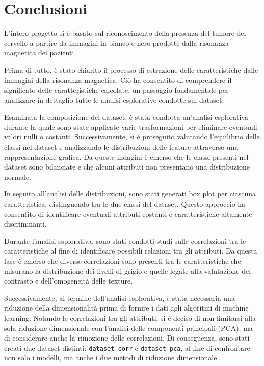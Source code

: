 \chapter{Conclusioni}
L'intero progetto si è basato sul riconoscimento della presenza del tumore del
cervello a partire da immagini in bianco e nero prodotte dalla risonanza
magnetica dei pazienti.

Prima di tutto, è stato chiarito il processo di estrazione delle caratteristiche
dalle immagini della risonanza magnetica. Ciò ha consentito di comprendere il
significato delle caratteristiche calcolate, un passaggio fondamentale per
analizzare in dettaglio tutte le analisi esplorative condotte sul dataset.

Esaminata la composizione del dataset, è stata condotta un'analisi esplorativa
durante la quale sono state applicate varie trasformazioni per eliminare
eventuali valori nulli o costanti. Successivamente, si è proseguito valutando
l'equilibrio delle classi nel dataset e analizzando le distribuzioni delle
feature attraverso una rappresentazione grafica. Da queste indagini è emerso che
le classi presenti nel dataset sono bilanciate e che alcuni attributi non presentano
una distribuzione normale.

In seguito all'analisi delle distribuzioni, sono stati generati box plot per
ciascuna caratteristica, distinguendo tra le due classi del dataset. Questo
approccio ha consentito di identificare eventuali attributi costanti e
caratteristiche altamente discriminanti.

Durante l'analisi esplorativa, sono stati condotti studi sulle correlazioni tra
le caratteristiche al fine di identificare possibili relazioni tra gli attributi.
Da questa fase è emerso che diverse correlazioni sono presenti tra le
caratteristiche che misurano la distribuzione dei livelli di grigio e quelle
legate alla valutazione del contrasto e dell'omogeneità delle texture.

Successivamente, al termine dell'analisi esplorativa, è stata necessaria una
riduzione della dimensionalità prima di fornire i dati agli algoritmi di machine
learning. Notando le correlazioni tra gli attributi, si è deciso di non limitarsi
alla sola riduzione dimensionale con l'analisi delle componenti principali (PCA),
ma di considerare anche la rimozione delle correlazioni. Di conseguenza, sono
stati creati due dataset distinti: \texttt{dataset\_corr} e \texttt{dataset\_pca},
al fine di confrontare non solo i modelli, ma anche i due metodi di riduzione
dimensionale.


